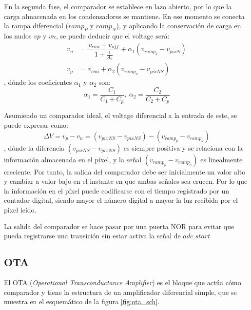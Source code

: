 En la segunda fase, el comparador se establece en lazo abierto, por lo que la carga
almacenada en los condensadores se mantiene. En ese momento se conecta la
rampa diferencial ($ramp_P$ y $ramp_N$), y aplicando la conservación de carga en los
nudos $vp$ y $vn$, se puede deducir que el voltage será:\\

\begin{align}
	v_n &= \dfrac{v_{cmi} + v_{off}}{1+\frac{1}{A_0}} + \alpha_1 (v_{ramp_p}-v_{pixN})\\
	v_p &= v_{cmi} + \alpha_2 (v_{ramp_n}-v_{pixNS})
\end{align}
, dónde los coeficientes $\alpha_1$ y $\alpha_2$ son:\\

\begin{equation}
	\alpha_1 = \dfrac{C_1}{C_1+C_p},~
	\alpha_2 = \dfrac{C_2}{C_2+C_p}
\end{equation}

Asumiendo un comparador ideal, el voltage diferencial a la entrada de este, se
puede expresar como:\\

\begin{equation}
	\Delta V= v_p - v_n = (v_{pixNS}-v_{pixNS}) - (v_{ramp_p}-v_{ramp_n})
\end{equation}
, dónde la diferencia $(v_{pixNS}-v_{pixNS})$ es siempre positiva y se relaciona
con la información almacenada en el píxel, y la señal $(v_{ramp_p}-v_{ramp_n})$ es
linealmente creciente. Por tanto, la salida del comparador debe ser inicialmente
un valor alto y cambiar a valor bajo en el instante en que ambas señales sea crucen.
Por lo que la información en el píxel puede codificarse con el tiempo registrado
por un contador digital, siendo mayor el número digital a mayor la luz recibida
por el pixel leído.

La salida del comparador se hace pasar por una puerta NOR para evitar que pueda
registrarse una transición sin estar activa la señal de $adc\_start$\\

\subsection{OTA}\label{cap:ro_sch_ota}

El OTA (\textit{Operational Transconductance Amplifier}) es el bloque que actúa
cómo comparador y tiene la estructura de un amplificador diferencial simple, que
se muestra en el esquemático de la figura \ref{fig:ota_sch}.\\


